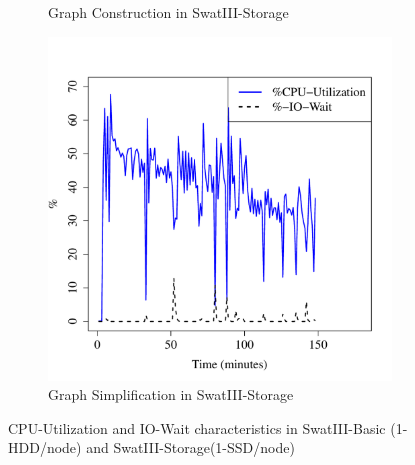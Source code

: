 \documentclass[conference]{IEEEtran}
\begin{document}
\begin{figure}[htb]
\begin{subfigure}[b]{0.23\textwidth}
                \caption{Graph Construction in SwatIII-Storage}
                \label{fig:BGCPUSSD}
        \end{subfigure}    
        \begin{subfigure}[b]{0.23\textwidth}
                \includegraphics[width=\textwidth]{Figure/SystemData/Plots/ECCPUSSD.pdf}
                \caption{Graph Simplification in SwatIII-Storage}
                \label{fig:ECCPUSSD}
        \end{subfigure}
        \caption{CPU-Utilization and IO-Wait characteristics in SwatIII-Basic (1-HDD/node) and SwatIII-Storage(1-SSD/node)}\label{fig:HddSsdCPU}
\end{figure}
\end{document}
